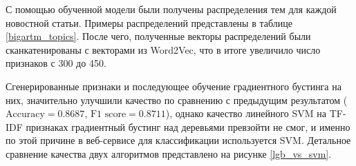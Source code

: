 \documentclass[a4paper, 14pt]{extarticle}
\begin{document}
С помощью обученной модели были получены распределения тем для каждой новостной статьи.
Примеры распределений представлены в таблице \ref{bigartm_topics}. После чего, полученные векторы распределений
были сканкатенированы с векторами из Word2Vec, что в итоге увеличило число признаков с 300 до 450.

\begin{table}[h!]
	\caption{Пример распределений слов в темах, полученных вероятностным тематическим моделированием, с помощью библиотеки bigARTM}
	\label{bigartm_topics}
\end{table}

Сгенерированные признаки и последующее обучение градиентного бустинга на них, значительно улучшили качество по сравнению
с предыдущим результатом ($\text{Accuracy} = 0.8687$, $\text{F1 score} = 0.8711$), однако качество линейного SVM на TF-IDF признаках
градиентный бустинг над деревьями превзойти не смог, и именно по этой причине в веб-сервисе для классификации используется SVM.
Детальное сравнение качества двух алгоритмов представлено на рисунке \ref{lgb_vs_svm}.
\end{document}
